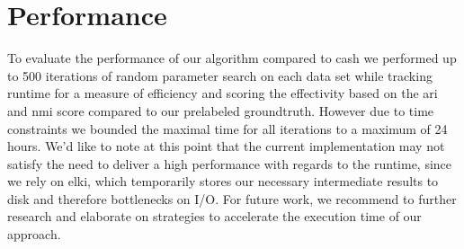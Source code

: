 \begin{figure}
\begin{minipage}[t]{.5\textwidth}
    \label{fig:my_label}
    \end{minipage}%
\end{figure}


\section{Performance}
 To evaluate the performance of our algorithm compared to \gls{cash} we performed up to 500 iterations of random parameter search on each data set while tracking runtime for a measure of efficiency and scoring the effectivity based on the \gls{ari} and \gls{nmi} score compared to our prelabeled groundtruth. However due to time constraints we bounded the maximal time for all iterations to a maximum of 24 hours. We’d like to note at this point that the current implementation may not satisfy the need to deliver a high performance with regards to the runtime, since we rely on \gls{elki}, which temporarily stores our necessary intermediate results to disk and therefore bottlenecks on I/O. For future work, we recommend to further research and elaborate on strategies to accelerate the execution time of our approach. 
 
\begin{table}[hb]
\centering
{}
\caption{}
\label{tab:reducedsetup}
\end{table}
 
